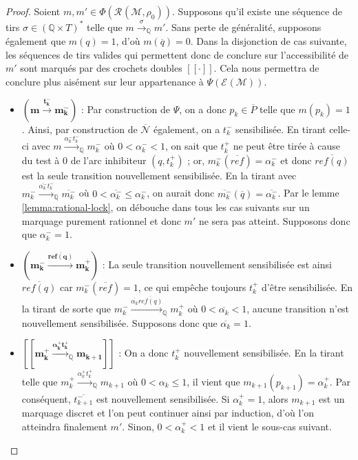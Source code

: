 \documentclass{article}
\theoremstyle{remark}
\theoremstyle{remark}
\newcommand{\reach}[3][]{\mathcal{R}^{#1}(\mathcal{#2}, #3)}
\newcommand{\reaches}[1][]{\xrightarrow{#1}}
\newcommand{\creaches}[1][]{\reaches[#1]_{\mathbb{Q}}}
\newcommand{\runs}[2][]{\mathcal{E}^{#1}(\mathcal{#2})}
\begin{document}
\begin{proof}
    Soient $m, m' \in \Phi(\reach{M}{\rho_0})$. Supposons qu'il existe une séquence de tirs $\sigma \in (\mathbb{Q} \times T)^*$ telle que $m \creaches[\sigma] m'$. Sans perte de généralité, supposons également que $m(q) = 1$, d'où $m(\overline{q}) = 0$. Dans la disjonction de cas suivante, les séquences de tirs valides qui permettent donc de conclure sur l'accessibilité de $m'$ sont marqués par des crochets doubles $[\![\cdot]\!]$. Cela nous permettra de conclure plus aisément sur leur appartenance à $\Psi(\runs{\mathcal{M}})$.
    \begin{itemize}
        \item $\mathbf{(m \reaches[t_k^-] m_k^-)}$ : Par construction de $\Psi$, on a donc $p_k \in \overline{P}$ telle que $m(p_k) = 1$. Ainsi, par construction de $\overline{\mathcal{N}}$ également, on a $t_k^-$ sensibilisée. En tirant celle-ci avec $m \creaches[\alpha_k^- t_k^-] m_k^-$ où $0 < \alpha_k^- < 1$, on sait que $t_k^+$ ne peut être tirée à cause du test à 0 de l'arc inhibiteur $(q, t_k^+)$ ; or, $m_k^-(\overline{ref}) = \alpha_k^-$ et donc $\overline{ref(q)}$ est la seule transition nouvellement sensibilisée.
        En la tirant avec $m_k^- \creaches[\overline{\alpha_k^-}t_k^-] \overline{m_k^-}$ où $0 < \overline{\alpha_k^-} \leq \alpha_k^-$, on aurait donc $\overline{m_k^-}(\overline{q}) = \overline{\alpha_k^-}$. Par le lemme \ref{lemma:rational-lock}, on débouche dans tous les cas suivants sur un marquage purement rationnel et donc $m'$ ne sera pas atteint. Supposons donc que $\alpha_k^- = 1$.
        \item $\mathbf{(m_k^- \reaches[\overline{ref(q)}] m_k^+)}$ : La seule transition nouvellement sensibilisée est ainsi $\overline{ref(q)}$ car $m_k^-(\overline{ref}) = 1$, ce qui empêche toujours $t_k^+$ d'être sensibilisée. En la tirant de sorte que $m_k^- \creaches[\overline{\alpha_k} \overline{ref(q)}] m_k^+$ où $0 < \overline{\alpha_k} < 1$, aucune transition n'est nouvellement sensibilisée. Supposons donc que $\overline{\alpha_k} = 1$.
        \item $\mathbf{[\![m_k^+ \creaches[\boldsymbol{\alpha}_k^+t_k^+] m_{k+1}]\!]}$ : On a donc $t_k^+$ nouvellement sensibilisée. En la tirant telle que $m_k^+ \creaches[\alpha_k^+ t_k^+] m_{k+1}$ où $0 < \alpha_k \leq 1$, il vient que $m_{k+1}(p_{k+1}) = \alpha_k^+$. Par conséquent, $\overline{t_{k+1}^-}$ est nouvellement sensibilisée. Si $\alpha_k^+ = 1$, alors $m_{k+1}$ est un marquage discret et l'on peut continuer ainsi par induction, d'où l'on atteindra finalement $m'$. Sinon, $0 < \alpha_{k}^+ < 1$ et il vient le sous-cas suivant.

\end{itemize}
\end{proof}
\end{document}
